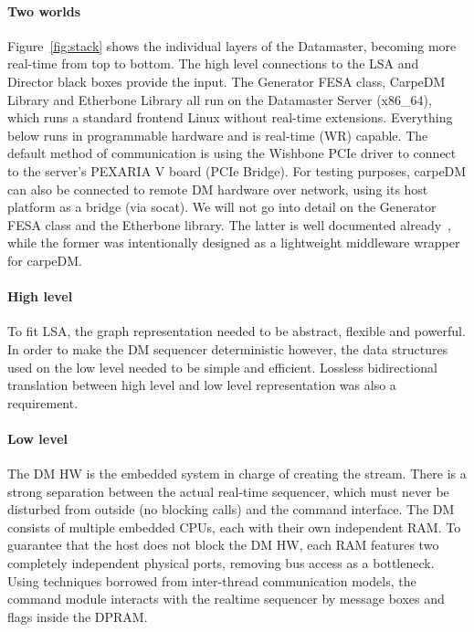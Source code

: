 \paragraph{Two worlds}
Figure~\ref{fig:stack} shows the individual layers of the Datamaster, becoming more real-time from top to bottom. The high level connections to the LSA and Director black boxes provide the input.
The Generator FESA class, CarpeDM Library and Etherbone Library all run on the Datamaster Server (x86\_64), which runs a standard frontend Linux without real-time extensions. Everything below
runs in programmable hardware and is real-time (WR) capable. The default method of communication is using the Wishbone PCIe driver to connect to the server's PEXARIA V board (PCIe Bridge).
For testing purposes, carpeDM can also be connected to remote DM hardware over network, using its host platform as a bridge (via socat). We will not go into detail on the Generator
FESA class and the Etherbone library.
The latter is well documented already~\cite{terpstra_etherbone_2012}, while the former was intentionally designed as a lightweight middleware wrapper for carpeDM.
\paragraph{High level}
To fit LSA, the graph representation needed to be abstract, flexible and powerful. In order to make the DM sequencer deterministic however, the data structures used on the low
level needed to be simple and efficient.
Lossless bidirectional translation between high level and low level representation was also a requirement.
\paragraph{Low level}
The DM HW is the embedded system in charge of creating the stream. There is a strong separation between the actual real-time sequencer,
which must never be disturbed from outside (no blocking calls) and the command interface. The DM consists of multiple embedded CPUs, each with their own independent RAM. To guarantee
that the host does not block the DM HW, each RAM features two completely independent physical ports, removing bus access as a bottleneck. Using techniques borrowed from
inter-thread communication models, the command module interacts with the realtime sequencer by message boxes and flags inside the DPRAM.
